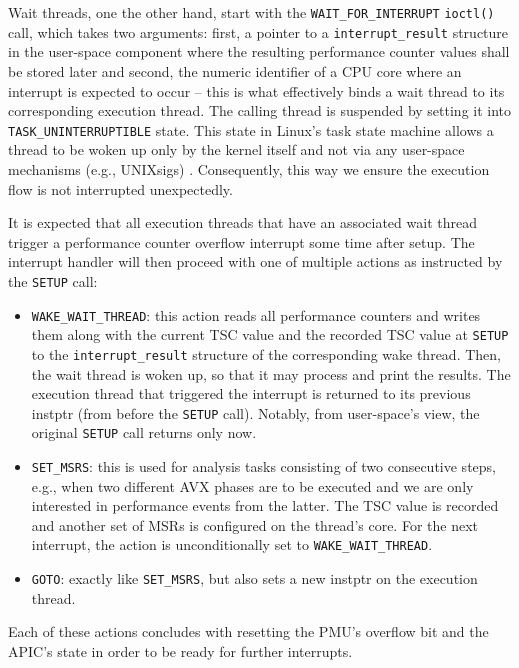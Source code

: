 Wait threads, one the other hand, start with the \texttt{WAIT\_FOR\_INTERRUPT} \texttt{ioctl()} call, which takes two arguments: first, a pointer to a \texttt{interrupt\_result} structure in the user-space component where the resulting performance counter values shall be stored later and second, the numeric identifier of a \gls{CPU} core where an interrupt is expected to occur -- this is what effectively binds a wait thread to its corresponding execution thread. The calling thread is suspended by setting it into \texttt{TASK\_UNINTERRUPTIBLE} state. This state in \gls{Linux}'s task state machine allows a thread to be woken up only by the kernel itself and not via any user-space mechanisms (e.g., \glspl{UNIXsig}) \cite{kernelschedheader}. Consequently, this way we ensure the execution flow is not interrupted unexpectedly.

It is expected that all execution threads that have an associated wait thread trigger a performance counter overflow interrupt some time after setup. The interrupt handler will then proceed with one of multiple actions as instructed by the \texttt{SETUP} call:\clearpage

\begin{itemize}
	\item \texttt{WAKE\_WAIT\_THREAD}: this action reads all performance counters and writes them along with the current \gls{TSC} value and the recorded \gls{TSC} value at \texttt{SETUP} to the \texttt{interrupt\_result} structure of the corresponding wake thread. Then, the wait thread is woken up, so that it may process and print the results. The execution thread that triggered the interrupt is returned to its previous \acrlong{instptr} (from before the \texttt{SETUP} call). Notably, from user-space's view, the original \texttt{SETUP} call returns only now.
	\item \texttt{SET\_MSRS}: this is used for analysis tasks consisting of two consecutive steps, e.g., when two different \gls{AVX} phases are to be executed and we are only interested in performance events from the latter. The \gls{TSC} value is recorded and another set of \glspl{MSR} is configured on the thread's core. For the next interrupt, the action is unconditionally set to \texttt{WAKE\_WAIT\_THREAD}.
	\item \texttt{GOTO}: exactly like \texttt{SET\_MSRS}, but also sets a new \acrlong{instptr} on the execution thread.
\end{itemize}

\noindent Each of these actions concludes with resetting the \gls{PMU}'s overflow bit and the \gls{APIC}'s state in order to be ready for further interrupts.

